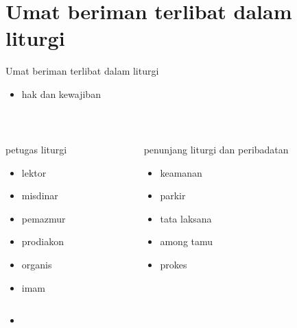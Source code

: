\documentclass[aspectratio=169]{beamer}
\begin{document}
\section{Umat beriman terlibat dalam liturgi}
\begin{frame}{Umat beriman terlibat dalam liturgi}

\begin{itemize}[<+->]
	\item hak dan kewajiban
    
    {~}
\end{itemize}

\begin{columns}
\begin{column}{0.5\textwidth}
petugas liturgi
\begin{itemize}[<+->]
	\item lektor
    \item misdinar
    \item pemazmur
    \item prodiakon
    \item organis
    \item imam
\end{itemize}
\end{column}
\begin{column}{0.5\textwidth}
penunjang liturgi dan peribadatan
\begin{itemize}[<+->]
	\item keamanan
    \item parkir
    \item tata laksana
    \item among tamu
    \item prokes
\end{itemize}
\end{column}
\end{columns}

\begin{itemize}[<+->]
	\item 
\end{itemize}


\end{frame}


\end{document}
